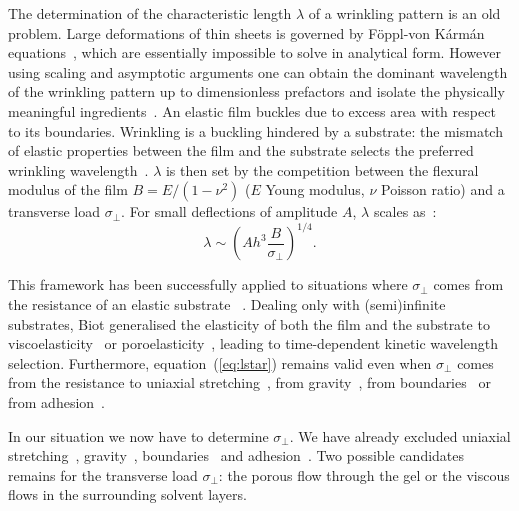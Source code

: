\documentclass[twocolumn,superscriptaddress,showpacs,preprintnumbers,
amsmath,amssymb,prl]{revtex4-1}
\begin{document}
The determination of the characteristic length $\lambda$ of a wrinkling pattern is an old problem. Large deformations of thin sheets is governed by F\"{o}ppl-von K\'arm\'an equations~\cite{landau1986}, which are essentially impossible to solve in analytical form. However using scaling and asymptotic arguments one can obtain the dominant wavelength of the wrinkling pattern up to dimensionless prefactors and isolate the physically meaningful ingredients~\cite{Cerda2003}. An elastic film buckles due to excess area with respect to its boundaries. Wrinkling is a buckling hindered by a substrate: the mismatch of elastic properties between the film and the substrate selects the preferred wrinkling wavelength~\cite{Gough1940, Bijlaard1946}. $\lambda$ is then set by the competition between the flexural modulus of the film $B=E/(1-\nu^2)$ ($E$ Young modulus, $\nu$ Poisson ratio) and a transverse load $\sigma_\perp$. For small deflections of  amplitude $A$, $\lambda$ scales as~\cite{Vella2009,Kolinski2009}: 
%
\begin{equation}
\lambda \sim \left( A h^3 \frac{B}{\sigma_{\perp}} \right)^{1/4}.
\label{eq:lstar}
\end{equation}



This framework has been successfully applied to situations where $\sigma_{\perp}$ comes from the resistance of an elastic substrate ~\cite{Gough1940, Bijlaard1946}. Dealing only with (semi)infinite substrates, Biot generalised the elasticity of both the film and the substrate to viscoelasticity~\cite{Biot1957} or poroelasticity~\cite{Biot1964}, leading to time-dependent kinetic wavelength selection. Furthermore, equation~(\ref{eq:lstar}) remains valid even when $\sigma_{\perp}$ comes from the resistance to uniaxial stretching~\cite{Cerda2003}, from gravity~\cite{Smoluchowski1910, Kolinski2009, Vella2009, Pineirua2013, Lucantonio2013}, from boundaries~\cite{Vandeparre2011a, Li2013} or from adhesion~\cite{Vella2009a}.

In our situation we now have to determine $\sigma_\perp$. We have already excluded uniaxial stretching~\cite{Cerda2003}, gravity~\cite{Smoluchowski1910, Kolinski2009, Vella2009, Pineirua2013, Lucantonio2013}, boundaries~\cite{Vandeparre2011a, Li2013} and adhesion~\cite{Vella2009a}. Two possible candidates remains for the transverse load $\sigma_\perp$: the porous flow through the gel or the viscous flows in the surrounding solvent layers.
\end{document}
